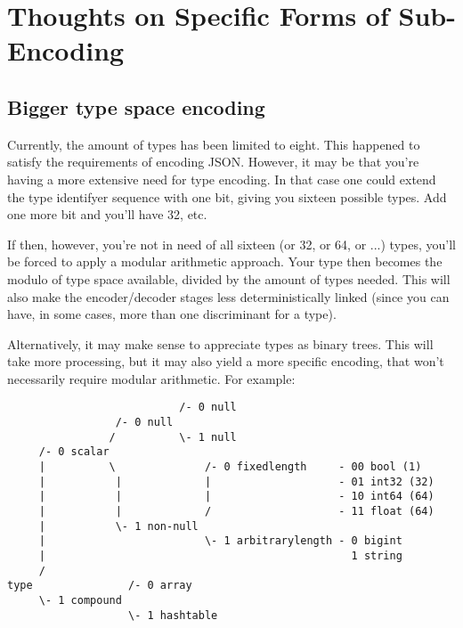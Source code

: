 \section{Thoughts on Specific Forms of Sub-Encoding}

\subsection{Bigger type space encoding}

Currently, the amount of types has been limited to eight. This happened
to satisfy the requirements of encoding JSON. However, it may be that you're
having a more extensive need for type encoding. In that case one could
extend the type identifyer sequence with one bit, giving you sixteen
possible types. Add one more bit and you'll have 32, etc.

If then, however, you're not in need of all sixteen (or 32, or 64, or ...)
types, you'll be forced to apply a modular arithmetic approach. Your type then
becomes the modulo of type space available, divided by the amount of
types needed. This will also make the encoder/decoder stages less
deterministically linked (since you can have, in some cases, more than
one discriminant for a type).

Alternatively, it may make sense to appreciate types as binary trees.
This will take more processing, but it may also yield a more
specific encoding, that won't necessarily require modular arithmetic.
For example:
\newpage
\begin{changemargin}{-60mm}{0mm}
\begin{myquote}
\begin{verbatim}
                           /- 0 null
                 /- 0 null
                /          \- 1 null
     /- 0 scalar
     |          \              /- 0 fixedlength     - 00 bool (1)
     |           |             |                    - 01 int32 (32)
     |           |             |                    - 10 int64 (64)
     |           |             /                    - 11 float (64)
     |           \- 1 non-null
     |                         \- 1 arbitrarylength - 0 bigint
     |                                                1 string
     /
type               /- 0 array
     \- 1 compound
                   \- 1 hashtable

\end{verbatim}
\end{myquote}
\end{changemargin}

